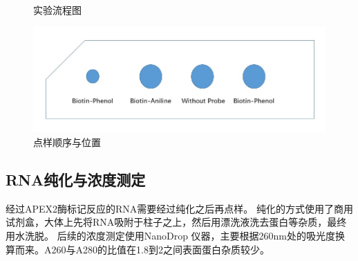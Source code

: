 \documentclass[UTF-8]{ctexart}
\begin{document}
 \begin{figure}
    \centering
    \caption{实验流程图}  
    \label{实验流程图}
 \end{figure}
 \begin{figure}
    \centering
    \includegraphics[width=0.7\linewidth]{../Figures/dotting.jpg}
    \caption{点样顺序与位置}
    \label{点样顺序与位置}
\end{figure}
\subsection{RNA纯化与浓度测定}
经过APEX2酶标记反应的RNA需要经过纯化之后再点样。
纯化的方式使用了商用试剂盒，大体上先将RNA吸附于柱子之上，然后用漂洗液洗去蛋白等杂质，最终用水洗脱。
后续的浓度测定使用NanoDrop 仪器，主要根据260nm处的吸光度换算而来。A260与A280的比值在1.8到2之间表面蛋白杂质较少。
\end{document}
